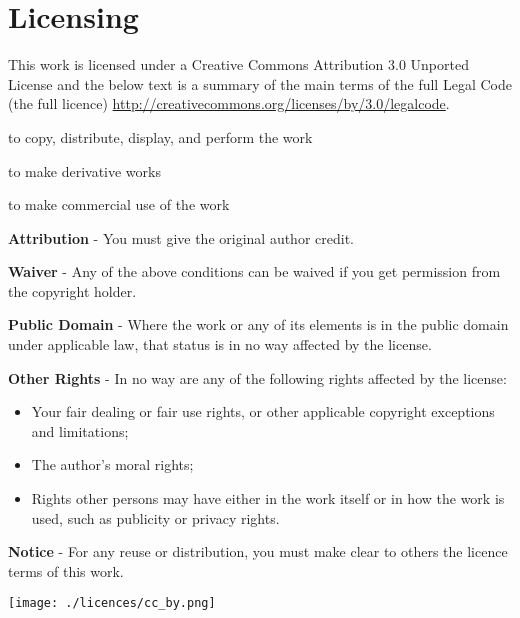\chapter{Licensing}

This work is licensed under a Creative Commons Attribution 3.0 Unported License and
the below text is a summary of the main terms of the full Legal Code (the full licence)
\url{http://creativecommons.org/licenses/by/3.0/legalcode}.

\begin{description}[style=multiline,labelindent=0cm,align=left,leftmargin=1.5cm]
\item[You are free:] \hfill

  to copy, distribute, display, and perform the work
  
  to make derivative works
  
  to make commercial use of the work
  
\item[Under the following conditions:] \hfill

  \textbf{Attribution} - You must give the original author credit.
  
\item[With the understanding that:] \hfill

  \textbf{Waiver} - Any of the above conditions can be waived if you get permission from the
  copyright holder.
  
  \textbf{Public Domain} - Where the work or any of its elements is in the public domain
  under applicable law, that status is in no way affected by the license.
  
  \textbf{Other Rights} - In no way are any of the following rights affected by the license:
  
  \begin{itemize}
    \item Your fair dealing or fair use rights, or other applicable copyright exceptions and limitations;
  
    \item The author's moral rights;
  
    \item Rights other persons may have either in the work itself or in how the work is used, such
    as publicity or privacy rights.
  \end{itemize}
  
  \textbf{Notice} - For any reuse or distribution, you must make clear to others the
  licence terms of this work.
  
\end{description}

\vspace{\fill}

\begin{center}
\texttt{[image: ./licences/cc\_by.png]}
\end{center}
